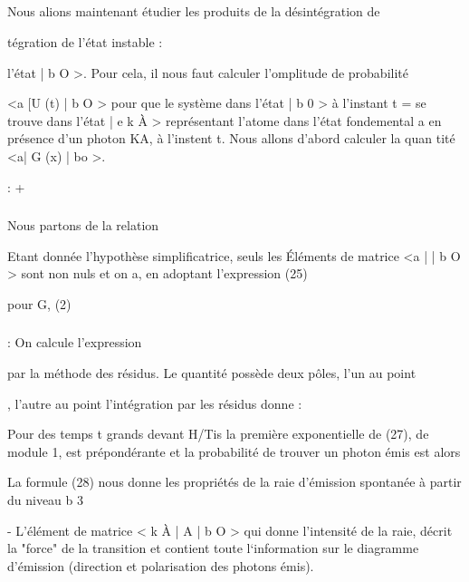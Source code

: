 \subsection{}%

Nous alions maintenant étudier les produits de la désintégration de

tégration de l'état instable :



l'état | b O >. Pour cela, il nous faut calculer l'omplitude de probabilité

<a  [U (t) | b O > pour que le système dans l'état | b 0 > à l'instant t =
se trouve dans l'état | e k À > représentant l'atome dans l'état fondemental a
en présence d'un photon KA, à l'instent t. Nous allons d'abord calculer la quan
tité <a| G (x) | bo >.


: +
\subsubsection{}%

Nous partons de la relation

Etant donnée l'hypothèse simplificatrice, seuls les Éléments de matrice
<a | | b O > sont non nuls et on a, en adoptant l'expression (25)

pour G, (2)



\subsubsection{}%
: On calcule l'expression

par la méthode des résidus.
Le quantité  possède deux pôles, l'un au point

, l'autre au point  l'intégration par les résidus
donne :

Pour des temps t grands devant H/Tis la première exponentielle
de (27), de module 1, est prépondérante et la probabilité de trouver un photon
 émis est alors


La formule (28) nous donne les propriétés de la raie d'émission spontanée à partir du niveau b 3

- L'élément de matrice <  k À | A | b O > qui donne l'intensité de la raie, décrit la "force" de la transition et contient toute l‘information sur le diagramme d'émission (direction et polarisation des photons
émis).

